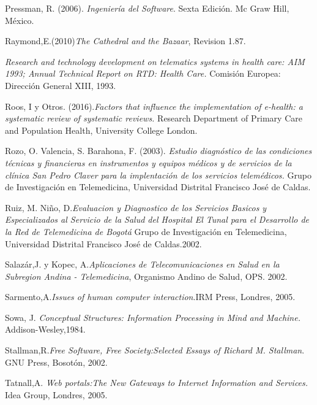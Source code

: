 \begin{thebibliography}{}
 Pressman, R. (2006). \textit{Ingeniería del Software}. Sexta Edición. Mc Graw 
Hill, México.

 Raymond,E.(2010)\textit{The Cathedral and the Bazaar}, Revision 1.87.

 \textit{Research and technology development on telematics systems in health care: AIM 1993; Annual Technical Report on RTD: Health Care.} Comisión Europea: Dirección General XIII, 1993.

 Roos, I y Otros. (2016).\textit{Factors that influence the implementation of e-health: a systematic review of systematic reviews.} Research Department of Primary Care and Population Health, University College London.

 Rozo, O. Valencia, S. Barahona, F. (2003). \textit{Estudio diagnóstico de las condiciones técnicas y financieras en instrumentos y equipos médicos  y de servicios de la clínica San Pedro Claver para la implentación de los servicios telemédicos.} Grupo de Investigación en Telemedicina,  Universidad Distrital Francisco José de Caldas.

 Ruiz, M. Niño, D.\textit{Evaluacion y Diagnostico de los Servicios Basicos y Especializados al Servicio de la Salud del Hospital El Tunal para el Desarrollo de la Red de Telemedicina de Bogotá} Grupo de Investigación en Telemedicina,  Universidad Distrital Francisco José de Caldas.2002.

 Salazár,J. y Kopec, A.\textit{Aplicaciones de Telecomunicaciones en Salud en la Subregion Andina - Telemedicina}, Organismo Andino de Salud, OPS. 2002.

 Sarmento,A.\textit{Issues of human computer interaction}.IRM Press, Londres, 2005. 

 Sowa, J. \textit{Conceptual Structures: Information Processing in Mind and Machine.} Addison-Wesley,1984.

 Stallman,R.\textit{Free Software, Free Society:Selected Essays of Richard M. Stallman}. GNU Press, Bosotón, 2002.

 Tatnall,A. \textit{Web portals:The New Gateways to Internet Information and Services.} Idea Group, Londres, 2005.


\end{thebibliography}
